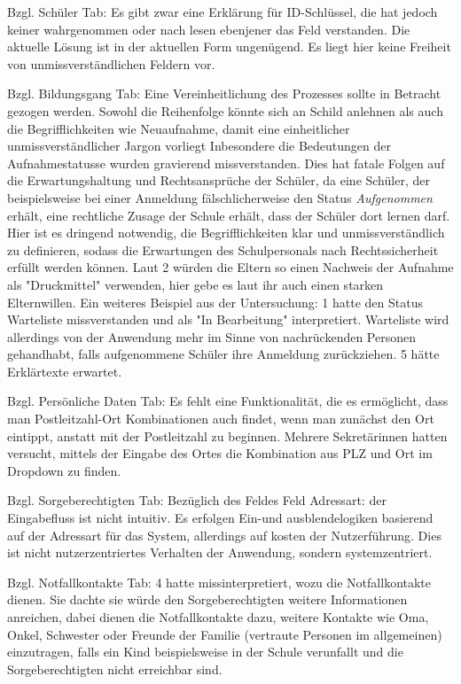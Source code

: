Bzgl. Schüler Tab: Es gibt zwar eine Erklärung für ID-Schlüssel, die hat jedoch keiner wahrgenommen oder nach lesen ebenjener das Feld verstanden. Die aktuelle Lösung ist in der aktuellen Form ungenügend. Es liegt hier keine Freiheit von unmissverständlichen Feldern vor.

Bzgl. Bildungsgang Tab:
Eine Vereinheitlichung des Prozesses sollte in Betracht gezogen werden. Sowohl die Reihenfolge könnte sich an Schild anlehnen als auch die Begrifflichkeiten wie Neuaufnahme, damit eine einheitlicher unmissverständlicher Jargon vorliegt
Inbesondere die Bedeutungen der Aufnahmestatusse wurden gravierend missverstanden. Dies hat fatale Folgen auf die Erwartungshaltung und Rechtsansprüche der Schüler, da eine Schüler, der beispielsweise bei einer Anmeldung fälschlicherweise den Status \textit{Aufgenommen} erhält, eine rechtliche Zusage der Schule erhält, dass der Schüler dort lernen darf. Hier ist es dringend notwendig, die Begrifflichkeiten klar und unmissverständlich zu definieren, sodass die Erwartungen des Schulpersonals nach Rechtssicherheit erfüllt werden können. Laut 2 würden die Eltern so einen Nachweis der Aufnahme als "Druckmittel" verwenden, hier gebe es laut ihr auch einen starken Elternwillen.
Ein weiteres Beispiel aus der Untersuchung:  1 hatte den Status Warteliste missverstanden und als "In Bearbeitung" interpretiert. Warteliste wird allerdings von der Anwendung mehr im Sinne von nachrückenden Personen gehandhabt, falls aufgenommene Schüler ihre Anmeldung zurückziehen. 5 hätte Erklärtexte erwartet. 

Bzgl. Persönliche Daten Tab:
Es fehlt eine Funktionalität, die es ermöglicht, dass man Postleitzahl-Ort Kombinationen auch findet, wenn man zunächst den Ort eintippt, anstatt mit der Postleitzahl zu beginnen. Mehrere Sekretärinnen hatten versucht, mittels der Eingabe des Ortes die Kombination aus PLZ und Ort im Dropdown zu finden.

Bzgl. Sorgeberechtigten Tab:
Bezüglich des Feldes Feld Adressart: der Eingabefluss ist nicht intuitiv. Es erfolgen Ein-und ausblendelogiken basierend auf der Adressart für das System, allerdings auf kosten der Nutzerführung. Dies ist nicht nutzerzentriertes Verhalten der Anwendung, sondern systemzentriert. 

Bzgl. Notfallkontakte Tab:
4 hatte missinterpretiert, wozu die Notfallkontakte dienen. Sie dachte sie würde den Sorgeberechtigten weitere Informationen anreichen, dabei dienen die Notfallkontakte dazu, weitere Kontakte wie Oma, Onkel, Schwester oder Freunde der Familie (vertraute Personen im allgemeinen) einzutragen, falls ein Kind beispielsweise in der Schule verunfallt und die Sorgeberechtigten nicht erreichbar sind.

